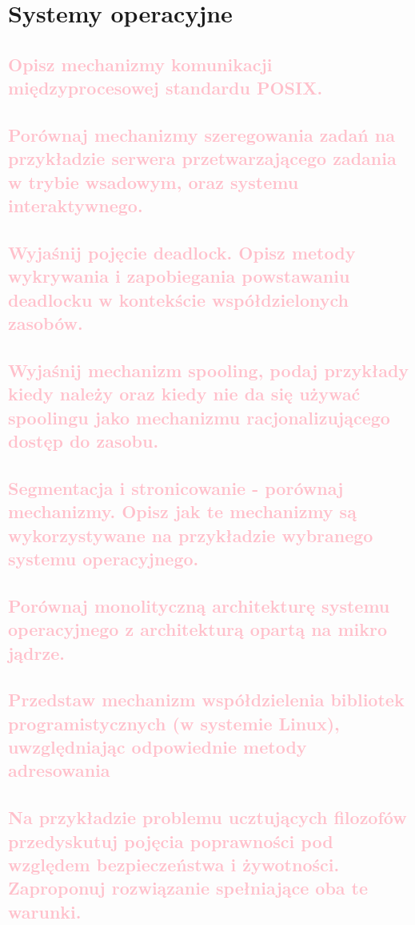 \chapter{Systemy operacyjne}
\label{sysopy}
\section{\textcolor{pink}{Opisz mechanizmy komunikacji międzyprocesowej standardu POSIX.}}


\section{\textcolor{pink}{Porównaj mechanizmy szeregowania zadań na przykładzie serwera przetwarzającego zadania w trybie wsadowym, oraz systemu interaktywnego.}}


\section{\textcolor{pink}{Wyjaśnij pojęcie deadlock. Opisz metody wykrywania i zapobiegania powstawaniu deadlocku w kontekście współdzielonych zasobów.}}


\section{\textcolor{pink}{Wyjaśnij mechanizm spooling, podaj przykłady kiedy należy oraz kiedy nie da się używać spoolingu jako mechanizmu racjonalizującego dostęp do zasobu.}}


\section{\textcolor{pink}{Segmentacja i stronicowanie - porównaj mechanizmy. Opisz jak te mechanizmy są wykorzystywane na przykładzie wybranego systemu operacyjnego.}}


\section{\textcolor{pink}{Porównaj monolityczną architekturę systemu operacyjnego z architekturą opartą na mikro jądrze.}}


\section{\textcolor{pink}{Przedstaw mechanizm współdzielenia bibliotek programistycznych (w systemie Linux), uwzględniając odpowiednie metody adresowania}}


\section{\textcolor{pink}{Na przykładzie problemu ucztujących filozofów przedyskutuj pojęcia poprawności pod względem bezpieczeństwa i żywotności. Zaproponuj rozwiązanie spełniające oba te warunki.}}
